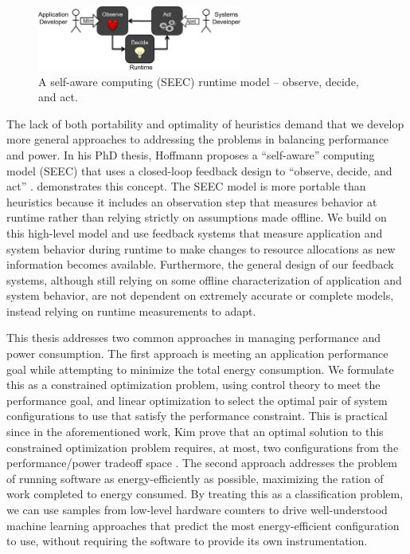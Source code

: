 \begin{figure}[t]
  \begin{centering}
  \includegraphics[width=0.6\textwidth]{figs/SEEC.png}
  \caption{A self-aware computing (SEEC) runtime model -- observe, decide, and act.}
  \label{fig:seec}
  \end{centering}
\end{figure}

The lack of both portability and optimality of heuristics demand that we develop more general approaches to addressing the problems in balancing performance and power.
In his PhD thesis, Hoffmann proposes a ``self-aware'' computing model (SEEC) that uses a closed-loop feedback design to ``observe, decide, and act'' \cite{HoffmannPhD}.
 demonstrates this concept.
The SEEC model is more portable than heuristics because it includes an observation step that measures behavior at runtime rather than relying strictly on assumptions made offline.
We build on this high-level model and use feedback systems that measure application and system behavior during runtime to make changes to resource allocations as new information becomes available.
Furthermore, the general design of our feedback systems, although still relying on some offline characterization of application and system behavior, are not dependent on extremely accurate or complete models, instead relying on runtime measurements to adapt.


This thesis addresses two common approaches in managing performance and power consumption.
The first approach is meeting an application performance goal while attempting to minimize the total energy consumption.
We formulate this as a constrained optimization problem, using control theory to meet the performance goal, and linear optimization to select the optimal pair of system configurations to use that satisfy the performance constraint.
This is practical since in the aforementioned work, Kim \etal prove that an optimal solution to this constrained optimization problem requires, at most, two configurations from the performance/power tradeoff space \cite{kim-cpsna2015}.
The second approach addresses the problem of running software as energy-efficiently as possible, \ie maximizing the ration of work completed to energy consumed.
By treating this as a classification problem, we can use samples from low-level hardware counters to drive well-understood machine learning approaches that predict the most energy-efficient configuration to use, without requiring the software to provide its own instrumentation.

